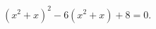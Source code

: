 \begin{ex}[type=equation]
	\begin{condition}
		$\left(x^2 + x\right)^2 - 6\left(x^2 + x\right) + 8 = 0.$
	\end{condition}
\end{ex}